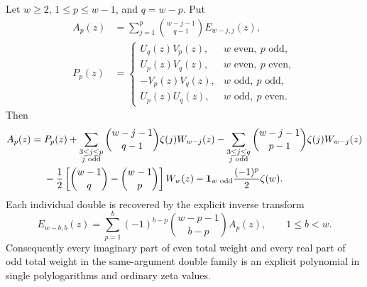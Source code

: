 \begin{theorem}\label{gaussian:thm:binomial-parity}
Let $w\ge2$, $1\le p\le w-1$, and $q=w-p$. Put
\begin{align*}
 A_p(z)&=\sum_{j=1}^{p}\binom{w-j-1}{q-1}E_{w-j,j}(z),\\
 P_p(z)&=
 \begin{cases}
 U_q(z)V_p(z),&w\text{ even},\ p\text{ odd},\\
 U_p(z)V_q(z),&w\text{ even},\ p\text{ even},\\
 -V_p(z)V_q(z),&w\text{ odd},\ p\text{ odd},\\
 U_p(z)U_q(z),&w\text{ odd},\ p\text{ even}.
 \end{cases}
\end{align*}
Then
\begin{align}
 A_p(z)={}&P_p(z)
 +\sum_{\substack{3\le j\le p\\j\text{ odd}}}
       \binom{w-j-1}{q-1}\zeta(j)W_{w-j}(z)
 -\sum_{\substack{3\le j\le q\\j\text{ odd}}}
       \binom{w-j-1}{p-1}\zeta(j)W_{w-j}(z)\notag\\
 &-\frac12\left[\binom{w-1}{q}-\binom{w-1}{p}\right]W_w(z)
 -\boldsymbol{1}_{w\text{ odd}}\frac{(-1)^p}{2}\zeta(w).
 \label{gaussian:eq:parity-A}
\end{align}
Each individual double is recovered by the explicit inverse transform
\begin{equation}\label{gaussian:eq:parity-inverse}
 E_{w-b,b}(z)=\sum_{p=1}^{b}(-1)^{b-p}
                  \binom{w-p-1}{b-p}A_p(z),\qquad 1\le b<w.
\end{equation}
Consequently every imaginary part of even total weight and every real part
of odd total weight in the same-argument double family is an explicit
polynomial in single polylogarithms and ordinary zeta values.
\end{theorem}

